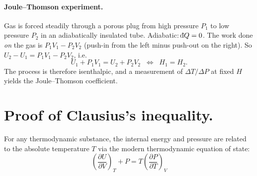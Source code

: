 \paragraph{Joule--Thomson experiment.}
Gas is forced steadily through a porous plug from high pressure $P_1$ to low pressure $P_2$ in an adiabatically insulated tube. Adiabatic: $\dbar Q = 0$. The work done \emph{on} the gas is $P_1 V_1 - P_2 V_2$ (push-in from the left minus push-out on the right). So $U_2 - U_1 = P_1 V_1 - P_2 V_2$, i.e.\
\[
    U_1 + P_1 V_1 = U_2 + P_2 V_2 \;\;\Longleftrightarrow\;\; H_1 = H_2.
\]
The process is therefore isenthalpic, and a measurement of $\Delta T/\Delta P$ at fixed $H$ yields the Joule--Thomson coefficient.

\section{Proof of Clausius's inequality.} \label{sec:clausius_inequality}
\begin{lemma}
For any thermodynamic substance, the internal energy and pressure are related to the absolute temperature $T$ via the modern thermodynamic equation of state:
\[
\left(\frac{\partial U}{\partial V}\right)_T + P = T\left(\frac{\partial P}{\partial T}\right)_V
\]
\end{lemma}

